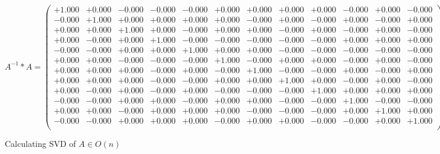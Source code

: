 \documentclass[9pt]{article}
\theoremstyle{plain}
\theoremstyle{definition}
\theoremstyle{remark}
\numberwithin{equation}{section}
\begin{document}
$A^{-1} *A = \left(
\begin{array}{
cccccccccccc}
+1.000 & +0.000 & -0.000 & -0.000 & -0.000 & +0.000 & +0.000 & +0.000 & +0.000 & -0.000 & +0.000 & -0.000 \\
-0.000 & +1.000 & +0.000 & +0.000 & +0.000 & +0.000 & -0.000 & +0.000 & -0.000 & +0.000 & -0.000 & +0.000 \\
+0.000 & +0.000 & +1.000 & +0.000 & -0.000 & +0.000 & +0.000 & -0.000 & +0.000 & -0.000 & +0.000 & -0.000 \\
+0.000 & -0.000 & +0.000 & +1.000 & -0.000 & -0.000 & -0.000 & -0.000 & -0.000 & +0.000 & +0.000 & +0.000 \\
-0.000 & -0.000 & +0.000 & +0.000 & +1.000 & +0.000 & +0.000 & -0.000 & -0.000 & -0.000 & -0.000 & -0.000 \\
+0.000 & +0.000 & -0.000 & -0.000 & -0.000 & +1.000 & -0.000 & +0.000 & +0.000 & -0.000 & +0.000 & -0.000 \\
+0.000 & +0.000 & +0.000 & -0.000 & +0.000 & -0.000 & +1.000 & -0.000 & -0.000 & +0.000 & -0.000 & +0.000 \\
+0.000 & +0.000 & +0.000 & -0.000 & -0.000 & +0.000 & +0.000 & +1.000 & +0.000 & -0.000 & +0.000 & -0.000 \\
+0.000 & -0.000 & +0.000 & -0.000 & +0.000 & -0.000 & -0.000 & -0.000 & +1.000 & +0.000 & +0.000 & +0.000 \\
-0.000 & -0.000 & +0.000 & +0.000 & -0.000 & +0.000 & +0.000 & -0.000 & -0.000 & +1.000 & -0.000 & -0.000 \\
+0.000 & +0.000 & -0.000 & +0.000 & +0.000 & +0.000 & -0.000 & -0.000 & -0.000 & +0.000 & +1.000 & +0.000 \\
-0.000 & -0.000 & +0.000 & +0.000 & +0.000 & -0.000 & +0.000 & +0.000 & -0.000 & -0.000 & +0.000 & +1.000 \\
\end{array}
\right)$ \newline 

Calculating SVD of  $A \in O(n)$
\end{document}
